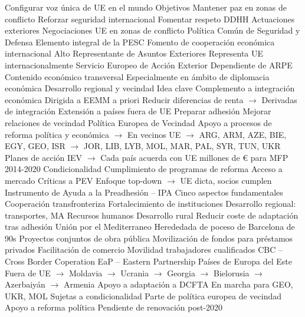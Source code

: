 \documentclass{nuevotema}
\begin{document}
\begin{esquemal}
				\4[] Configurar voz única de UE en el mundo
				\4 Objetivos
				\4[] Mantener paz en zonas de conflicto
				\4[] Reforzar seguridad internacional
				\4[] Fomentar respeto DDHH
			\3 Actuaciones exteriores
				\4 Negociaciones UE en zonas de conflicto
				\4 Política Común de Seguridad y Defensa
				\4[] Elemento integral de la PESC
				\4 Fomento de cooperación económica internacional
				\4 Alto Representante de Asuntos Exteriores
				\4[] Representa UE internacionalmente
				\4 Servicio Europeo de Acción Exterior
				\4[] Dependiente de ARPE
				\4[$\then$] Contenido económico transversal
				\4[$\then$] Especialmente en ámbito de diplomacia económica
		\2 Desarrollo regional y vecindad
			\3 Idea clave
				\4 Complemento a integración económica
				\4[] Dirigida a EEMM a priori
				\4[] Reducir diferencias de renta
				\4[] $\to$ Derivadas de integración
				\4 Extensión a países fuera de UE
				\4[] Preparar adhesión
				\4[] Mejorar relaciones de vecindad
			\3 Política Europea de Vecindad
				\4 Apoyo a procesos de reforma política y económica
				\4[] $\to$ En vecinos UE
				\4[] $\to$ ARG, ARM, AZE, BIE, EGY, GEO, ISR
				\4[] $\to$ JOR, LIB, LYB, MOL, MAR, PAL, SYR, TUN, UKR
				\4 Planes de acción IEV
				\4[] $\to$ Cada país acuerda con UE
				 millones de € para MFP 2014-2020
				\4 Condicionalidad
				\4[] Cumplimiento de programas de reforma
				\4[] Acceso a mercado
				\4 Críticas a PEV
				\4[] Enfoque top-down
				\4[] $\to$ UE dicta, socios cumplen
				\4[]
			\3 Instrumento de Ayuda a la Preadhesión -- IPA
				\4 Cinco aspectos fundamentales
				\4[] Cooperación transfronteriza
				\4[] Fortalecimiento de instituciones
				\4[] Desarrollo regional: transportes, MA
				\4[] Recursos humanos
				\4[] Desarrollo rural
				\4[$\then$] Reducir coste de adaptación tras adhesión
			\3 Unión por el Mediterraneo
				\4 Herededada de poceso de Barcelona de 90s
				\4 Proyectos conjuntos de obra pública
				\4 Movilización de fondos para préstamos privados
				\4 Facilitación de comercio
				\4 Movilidad trabajadores cualificados
				\4 CBC -- Cross Border Coperation
			\3 EaP -- Eastern Partnership
				\4 Países de Europa del Este
				\4[] Fuera de UE
				\4[] $\to$ Moldavia
				\4[] $\to$ Ucrania
				\4[] $\to$ Georgia
				\4[] $\to$ Bielorusia
				\4[] $\to$ Azerbaiyán
				\4[] $\to$ Armenia
				\4 Apoyo a adaptación a DCFTA
				\4[] En marcha para GEO, UKR, MOL
				\4 Sujetas a condicionalidad
				\4 Parte de política europea de vecindad
				\4 Apoyo a reforma política
				\4 Pendiente de renovación post-2020

\end{esquemal}
\end{document}
